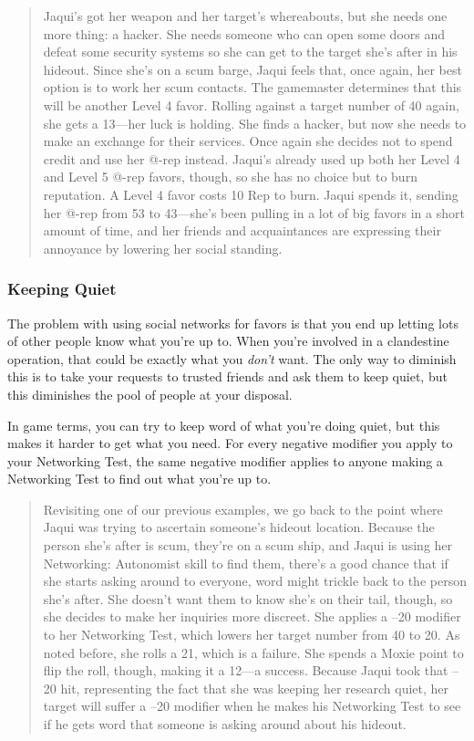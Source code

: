 \begin{quotation} Jaqui’s got her weapon and her target’s whereabouts, but she needs one more thing: a hacker. She needs someone who can open some doors and defeat some security systems so she can get to the target she’s after in his hideout. Since she’s on a scum barge, Jaqui feels that, once again, her best option is to work her scum contacts. The gamemaster determines that this will be another Level 4 favor. Rolling against a target number of 40 again, she gets a 13—her luck is holding. She finds a hacker, but now she needs to make an exchange for their services. Once again she decides not to spend credit and use her @-rep instead. Jaqui’s already used up both her Level 4 and Level 5 @-rep favors, though, so she has no choice but to burn reputation. A Level 4 favor costs 10 Rep to burn. Jaqui spends it, sending her @-rep from 53 to 43—she’s been pulling in a lot of big favors in a short amount of time, and her friends and acquaintances are expressing their annoyance by lowering her social standing. \end{quotation} 

\subsubsection{Keeping Quiet} 

The problem with using social networks for favors is that you end up letting lots of other people know what you're up to. When you're involved in a clandestine operation, that could be exactly what you \textit{don't} want. The only way to diminish this is to take your requests to trusted friends and ask them to keep quiet, but this diminishes the pool of people at your disposal. 

In game terms, you can try to keep word of what you're doing quiet, but this makes it harder to get what you need. For every negative modifier you apply to your Networking Test, the same negative modifier applies to anyone making a Networking Test to find out what you're up to. 

\begin{quotation} Revisiting one of our previous examples, we go back to the point where Jaqui was trying to ascertain someone’s hideout location. Because the person she’s after is scum, they’re on a scum ship, and Jaqui is using her Networking: Autonomist skill to find them, there’s a good chance that if she starts asking around to everyone, word might trickle back to the person she’s after. She doesn’t want them to know she’s on their tail, though, so she decides to make her inquiries more discreet. She applies a –20 modifier to her Networking Test, which lowers her target number from 40 to 20. As noted before, she rolls a 21, which is a failure. She spends a Moxie point to flip the roll, though, making it a 12—a success. Because Jaqui took that –20 hit, representing the fact that she was keeping her research quiet, her target will suffer a –20 modifier when he makes his Networking Test to see if he gets word that someone is asking around about his hideout. \end{quotation} 

